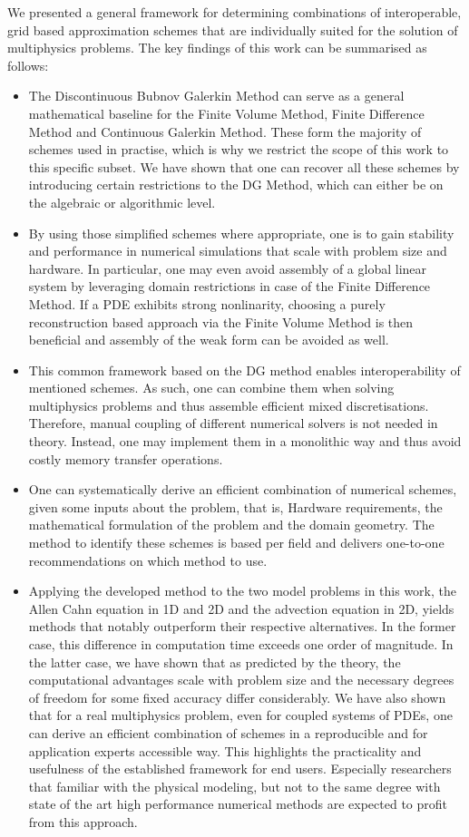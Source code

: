 \documentclass[sn-mathphys,Numbered]{sn-jnl}%
\theoremstyle{thmstyleone}%
\theoremstyle{thmstyletwo}%
\theoremstyle{thmstylethree}%
\begin{document}
We presented a general framework for determining combinations of interoperable, grid based approximation schemes that are individually suited for the solution of multiphysics problems.
The key findings of this work can be summarised as follows:
\begin{itemize}
    \item The Discontinuous Bubnov Galerkin Method can serve as a general mathematical baseline for the Finite Volume Method, Finite Difference Method and Continuous Galerkin Method.
    These form the majority of schemes used in practise, which is why we restrict the scope of this work to this specific subset.
    We have shown that one can recover all these schemes by introducing certain restrictions to the DG Method, which can either be on the algebraic or algorithmic level.
    \item By using those simplified schemes where appropriate, one is to gain stability and performance in numerical simulations that scale with problem size and hardware.
    In particular, one may even avoid assembly of a global linear system by leveraging domain restrictions in case of the Finite Difference Method.
    If a PDE exhibits strong nonlinarity, choosing a purely reconstruction based approach via the Finite Volume Method is then beneficial and assembly of the weak form can be avoided as well.
    \item This common framework based on the DG method enables interoperability of mentioned schemes.
    As such, one can combine them when solving multiphysics problems and thus assemble efficient mixed discretisations.
    Therefore, manual coupling of different numerical solvers is not needed in theory.
    Instead, one may implement them in a monolithic way and thus avoid costly memory transfer operations.
    \item One can systematically derive an efficient combination of numerical schemes, given some inputs about the problem, that is, Hardware requirements, the mathematical formulation of the problem and the domain geometry. The method to identify these schemes is based per field and delivers one-to-one recommendations on which method to use.
    \item Applying the developed method to the two model problems in this work, the Allen Cahn equation in 1D and 2D and the advection equation in 2D, yields methods that notably outperform their respective alternatives. In the former case, this difference in computation time exceeds one order of magnitude.
    In the latter case, we have shown that as predicted by the theory, the computational advantages scale with problem size and the necessary degrees of freedom for some fixed accuracy differ considerably.
    We have also shown that for a real multiphysics problem, even for coupled systems of PDEs, one can derive an efficient combination of schemes in a reproducible and for application experts accessible way.
    This highlights the practicality and usefulness of the established framework for end users.
    Especially researchers that familiar with the physical modeling, but not to the same degree with state of the art high performance numerical methods are expected to profit from this approach.
\end{itemize}
\end{document}
